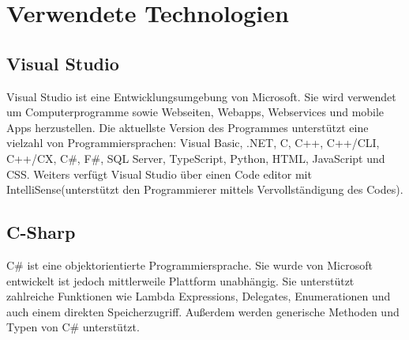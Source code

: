 \chapter{Verwendete Technologien}\label{cha:theoretical-background}


\section{Visual Studio}
Visual Studio ist eine Entwicklungsumgebung von Microsoft. Sie wird verwendet um Computerprogramme sowie Webseiten, Webapps, Webservices und mobile Apps herzustellen. Die aktuellste Version des Programmes unterstützt eine vielzahl von Programmiersprachen: Visual Basic, .NET, C, C++, C++/CLI, C++/CX, C\#, F\#, SQL Server, TypeScript, Python, HTML, JavaScript und CSS.
Weiters verfügt Visual Studio über einen Code editor mit IntelliSense(unterstützt den Programmierer mittels Vervollständigung des Codes).

\section{C-Sharp}
C\# ist eine objektorientierte Programmiersprache. Sie wurde von Microsoft entwickelt ist jedoch mittlerweile Plattform unabhängig. Sie unterstützt zahlreiche Funktionen wie Lambda Expressions, Delegates, Enumerationen und auch einem direkten Speicherzugriff. Außerdem werden generische Methoden und Typen von C\# unterstützt.


